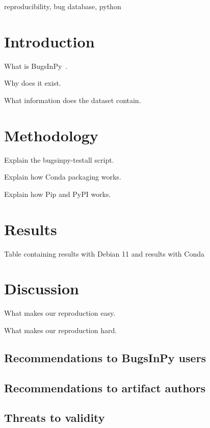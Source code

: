 \documentclass[conference]{IEEEtran}
\begin{document}
\begin{IEEEkeywords}
reproducibility, bug database, python
\end{IEEEkeywords}


\section{Introduction}

What is BugsInPy~\cite{widyasari_bugsinpy_2020}.

Why does it exist.

What information does the dataset contain.

\section{Methodology}

Explain the bugsinpy-testall script.

Explain how Conda packaging works.

Explain how Pip and PyPI works.

\section{Results}

Table containing results with Debian 11 and results with Conda

\section{Discussion}

What makes our reproduction easy.

What makes our reproduction hard.

\subsection{Recommendations to BugsInPy users}

\subsection{Recommendations to artifact authors}

\subsection{Threats to validity}
\end{document}

